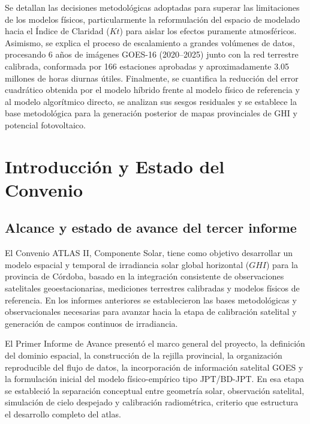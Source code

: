 \documentclass[../main.tex]{subfiles}
\begin{document}
Se detallan las decisiones metodológicas adoptadas para superar las limitaciones de los modelos físicos, particularmente la reformulación del espacio de modelado hacia el Índice de Claridad ($Kt$) para aislar los efectos puramente atmosféricos. Asimismo, se explica el proceso de escalamiento a grandes volúmenes de datos, procesando 6 años de imágenes GOES-16 (2020--2025) junto con la red terrestre calibrada, conformada por 166 estaciones aprobadas y aproximadamente 3.05 millones de horas diurnas útiles. Finalmente, se cuantifica la reducción del error cuadrático obtenida por el modelo híbrido frente al modelo físico de referencia y al modelo algorítmico directo, se analizan sus sesgos residuales y se establece la base metodológica para la generación posterior de mapas provinciales de GHI y potencial fotovoltaico.

\bigskip

\newpage

\tableofcontents

\newpage

\section{Introducción y Estado del Convenio}

\subsection{Alcance y estado de avance del tercer informe}

El Convenio ATLAS II, Componente Solar, tiene como objetivo desarrollar un modelo espacial y temporal de irradiancia solar global horizontal ($GHI$) para la provincia de Córdoba, basado en la integración consistente de observaciones satelitales geoestacionarias, mediciones terrestres calibradas y modelos físicos de referencia. En los informes anteriores se establecieron las bases metodológicas y observacionales necesarias para avanzar hacia la etapa de calibración satelital y generación de campos continuos de irradiancia.

El Primer Informe de Avance presentó el marco general del proyecto, la definición del dominio espacial, la construcción de la rejilla provincial, la organización reproducible del flujo de datos, la incorporación de información satelital GOES y la formulación inicial del modelo físico-empírico tipo JPT/BD-JPT. En esa etapa se estableció la separación conceptual entre geometría solar, observación satelital, simulación de cielo despejado y calibración radiométrica, criterio que estructura el desarrollo completo del atlas.
\end{document}

